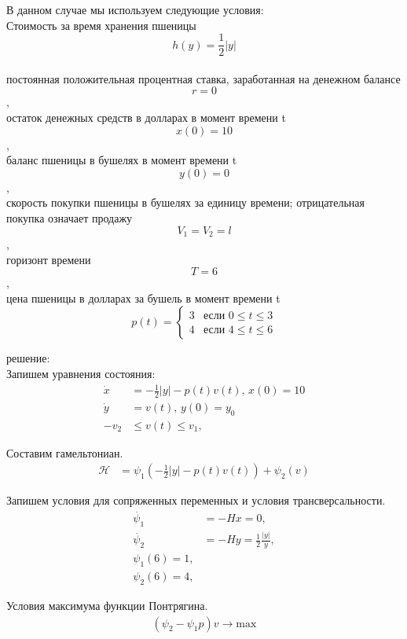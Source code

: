 В данном случае мы используем следующие условия:\\
 Стоимость за время хранения пшеницы $$ h(y) = \frac{1}{2}|y|$$\\
постоянная положительная процентная ставка, заработанная на денежном балансе $$ r = 0 $$,\\
остаток денежных средств в долларах в момент времени t $$ x(0) = 10$$,\\
баланс пшеницы в бушелях в момент времени t $$ y(0) = 0$$,\\
скорость покупки пшеницы в бушелях за единицу времени; отрицательная покупка означает продажу $$ V_{1} = V_{2} = l $$,\\
горизонт времени $$ T = 6 $$,\\
цена пшеницы в долларах за бушель в момент времени t
\begin{displaymath}
p(t) =\left\{ \begin{array}{ll}
 3 & \textrm{если $0 \le t\le 3$}\\
 4 & \textrm{если $4  \le t  \le 6$}
  \end{array} \right.
\end{displaymath}


решение:\\

Запишем уравнения состояния:
\begin{align}
    \Dot{x} & = - \frac{1}{2}|y| - p(t) v(t),\, x(0) = 10 \\
    \Dot{y} & = v(t), \, y(0) = y_{0}\\
    - v_2 & \le v(t) \le v_1,
\end{align}     

Составим гамельтониан. 
\begin{align}
    \mathcal{H} & = \psi_{1} (- \frac{1}{2}|y| - p(t) v(t)) + \psi_{2} (v)
\end{align} 

Запишем условия для сопряженных переменных и условия трансверсальности.
\begin{align}
    \Dot{\psi_{1}} & = -H x = 0,\\
    \Dot{\psi_{2}} & = -H y =  \frac{1}{2}\frac{|y|}{y},\\
    {\psi_{1}(6)} = 1,\\
    {\psi_{2}(6)} = 4,
\end{align} 

Условия максимума функции Понтрягина.
\begin{align}
    (\psi_{2} - \psi_{1} p)v\to \mathrm{max}
\end{align} 

